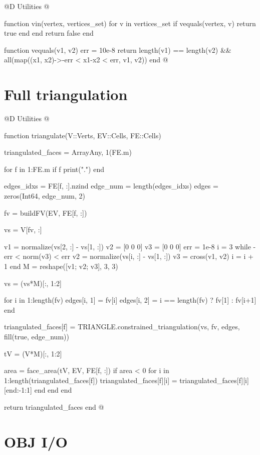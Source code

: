 @D Utilities
@{function vin(vertex, vertices_set)
    for v in vertices_set
        if vequals(vertex, v)
            return true
        end
    end
    return false
end

function vequals(v1, v2)
    err = 10e-8
    return length(v1) == length(v2) && all(map((x1, x2)->-err < x1-x2 < err, v1, v2))
end
@}

\section{Full triangulation}


@D Utilities
@{function triangulate(V::Verts, EV::Cells, FE::Cells)

    triangulated_faces = Array{Any, 1}(FE.m)

    for f in 1:FE.m
        if f %
            print(".")
        end
        
        edges_idxs = FE[f, :].nzind
        edge_num = length(edges_idxs)
        edges = zeros(Int64, edge_num, 2)

        
        fv = buildFV(EV, FE[f, :])

        vs = V[fv, :]

        v1 = normalize(vs[2, :] - vs[1, :])
        v2 = [0 0 0]
        v3 = [0 0 0]
        err = 1e-8
        i = 3
        while -err < norm(v3) < err
            v2 = normalize(vs[i, :] - vs[1, :])
            v3 = cross(v1, v2)
            i = i + 1
        end
        M = reshape([v1; v2; v3], 3, 3)

        vs = (vs*M)[:, 1:2]
        
        for i in 1:length(fv)
            edges[i, 1] = fv[i]
            edges[i, 2] = i == length(fv) ? fv[1] : fv[i+1]
        end
        
        triangulated_faces[f] = TRIANGLE.constrained_triangulation(vs, fv, edges, fill(true, edge_num))

        tV = (V*M)[:, 1:2]
        
        area = face_area(tV, EV, FE[f, :])
        if area < 0 
            for i in 1:length(triangulated_faces[f])
                triangulated_faces[f][i] = triangulated_faces[f][i][end:-1:1]
            end
        end
    end

    return triangulated_faces
end
@}


\section{OBJ I/O}

